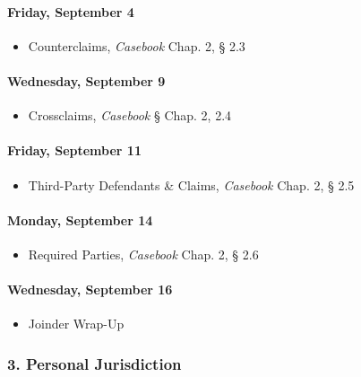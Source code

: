 \documentclass[11pt,letterpaper,twoside]{article}
\providecommand{\tightlist}{%
\setlength{\itemsep}{0em}\setlength{\parskip}{0em}\setlength{\itemindent}{0em}}
\begin{document}
\paragraph{Friday, September 4}\label{friday-september-4}

\begin{itemize}
\tightlist
\item
  Counterclaims, \emph{Casebook} Chap. 2, § 2.3
\end{itemize}

\paragraph{Wednesday, September 9}\label{wednesday-september-9}

\begin{itemize}
\tightlist
\item
  Crossclaims, \emph{Casebook} § Chap. 2, 2.4
\end{itemize}

\paragraph{Friday, September 11}\label{friday-september-11}

\begin{itemize}
\tightlist
\item
  Third-Party Defendants \& Claims, \emph{Casebook} Chap. 2, § 2.5
\end{itemize}

\paragraph{Monday, September 14}\label{monday-september-14}

\begin{itemize}
\tightlist
\item
  Required Parties, \emph{Casebook} Chap. 2, § 2.6
\end{itemize}

\paragraph{Wednesday, September 16}\label{wednesday-september-16}

\begin{itemize}
\tightlist
\item
  Joinder Wrap-Up
\end{itemize}

\subsubsection{3. Personal Jurisdiction}\label{personal-jurisdiction}
\end{document}
